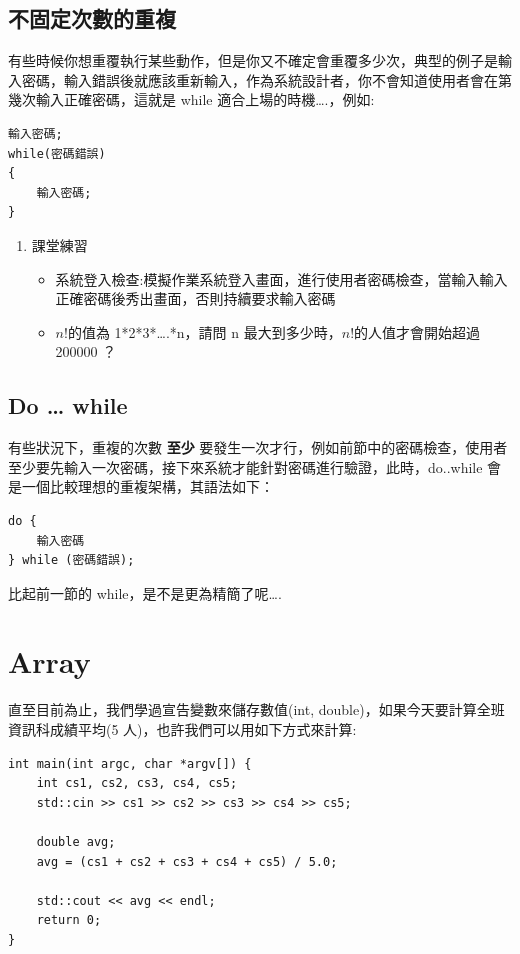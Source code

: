 \documentclass[a4paper,12pt]{article}
\begin{document}
\subsection{不固定次數的重複}
\label{sec:orgc78905c}
有些時候你想重覆執行某些動作，但是你又不確定會重覆多少次，典型的例子是輸入密碼，輸入錯誤後就應該重新輸入，作為系統設計者，你不會知道使用者會在第幾次輸入正確密碼，這就是 while 適合上場的時機\ldots{}.，例如:\\
\lstset{breaklines=true,language=cpp,label= ,caption= ,captionpos=b,firstnumber=1,numbers=left}
\begin{lstlisting}
輸入密碼;
while(密碼錯誤)
{
    輸入密碼;
}
\end{lstlisting}

\begin{enumerate}
\item 課堂練習
\label{sec:org65a6de9}
\begin{itemize}
\item 系統登入檢查:模擬作業系統登入畫面，進行使用者密碼檢查，當輸入輸入正確密碼後秀出畫面，否則持續要求輸入密碼\\
\item \(n!\)的值為 1*2*3*\ldots{}.*n，請問 n 最大到多少時，\(n!\)的人值才會開始超過 200000 ？\\
\end{itemize}
\end{enumerate}

\subsection{Do \ldots{} while}
\label{sec:orga70ae16}
有些狀況下，重複的次數 \textbf{至少} 要發生一次才行，例如前節中的密碼檢查，使用者至少要先輸入一次密碼，接下來系統才能針對密碼進行驗證，此時，do..while 會是一個比較理想的重複架構，其語法如下：\\
\lstset{breaklines=true,language=cpp,label= ,caption= ,captionpos=b,firstnumber=1,numbers=left}
\begin{lstlisting}
do {
    輸入密碼
} while (密碼錯誤);
\end{lstlisting}

比起前一節的 while，是不是更為精簡了呢\ldots{}.\\

\section{Array}
\label{cpp_arrays}
直至目前為止，我們學過宣告變數來儲存數值(int, double)，如果今天要計算全班資訊科成績平均(5 人)，也許我們可以用如下方式來計算:\\
\lstset{breaklines=true,language=cpp,label= ,caption= ,captionpos=b,firstnumber=1,numbers=left}
\begin{lstlisting}
int main(int argc, char *argv[]) {
    int cs1, cs2, cs3, cs4, cs5;
    std::cin >> cs1 >> cs2 >> cs3 >> cs4 >> cs5;

    double avg;
    avg = (cs1 + cs2 + cs3 + cs4 + cs5) / 5.0;

    std::cout << avg << endl;
    return 0;
}
\end{lstlisting}
\end{document}
